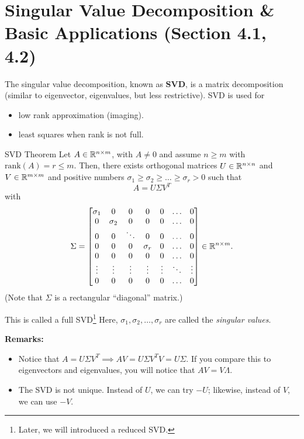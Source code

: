 \documentclass[letterpaper]{article}
\newcommand{\0}{\mathbf{0}}
\begin{document}
\section{Singular Value Decomposition \& Basic Applications (Section 4.1, 4.2)}
The singular value decomposition, known as \textbf{SVD}, is a matrix decomposition (similar to eigenvector, eigenvalues, but less restrictive). SVD is used for 
\begin{itemize}
    \item low rank approximation (imaging).
    \item least squares when rank is not full. 
\end{itemize}

\begin{theorem}{SVD Theorem}{}
    Let $A \in \mathbb{R}^{n \times m}$, with $A \neq 0$ and assume $n \geq m$ with $\text{rank}(A) = r \leq m$. Then, there exists orthogonal matrices $U \in \mathbb{R}^{n \times n}$ and $V \in \mathbb{R}^{m \times m}$ and positive numbers $\sigma_1 \geq \sigma_2 \geq \hdots \geq \sigma_r > 0$ such that \[A = U \Sigma V^T\] with \[\Sigma = \begin{bmatrix}
        \sigma_1 & 0 & 0 & 0 & 0 & \hdots & 0 \\ 
        0 & \sigma_2 & 0 & 0 & 0 & \hdots & 0 \\ 
        0 & 0 & \ddots & 0 & 0 & \hdots & 0 \\ 
        0 & 0 & 0 & \sigma_r & 0 & \hdots & 0 \\ 
        0 & 0 & 0 & 0 & 0 & \hdots & 0 \\ 
        \vdots & \vdots & \vdots & \vdots & \vdots & \ddots & \vdots \\ 
        0 & 0 & 0 & 0 & 0 & \hdots & 0
    \end{bmatrix} \in \mathbb{R}^{n \times m}.\]
    (Note that $\Sigma$ is a rectangular ``diagonal'' matrix.)
\end{theorem}
This is called a full SVD\footnote{Later, we will introduced a reduced SVD.} Here, $\sigma_1, \sigma_2, \hdots, \sigma_r$ are called the \emph{singular values}.

\textbf{Remarks:}
\begin{itemize}
    \item Notice that $A = U\Sigma V^T \implies AV = U\Sigma V^T V = U\Sigma$. If you compare this to eigenvectors and eigenvalues, you will notice that $AV = V\Lambda$. 
    
    \item The SVD is not unique. Instead of $U$, we can try $-U$; likewise, instead of $V$, we can use $-V$. 
\end{itemize}
\end{document}
